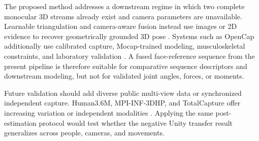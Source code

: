 The proposed method addresses a downstream regime in which two complete
monocular 3D streams already exist and camera parameters are unavailable.
Learnable triangulation and camera-aware fusion instead use images or 2D
evidence to recover geometrically grounded 3D pose
\citep{Iskakov2019Learnable,Qiu2019CrossView,Remelli2020Lightweight}. Systems
such as OpenCap additionally use calibrated capture, Mocap-trained modeling,
musculoskeletal constraints, and laboratory validation
\citep{Uhlrich2023OpenCap}. A fused face-reference sequence from the present
pipeline is therefore suitable for comparative sequence descriptors and
downstream modeling, but not for validated joint angles, forces, or moments.

Future validation should add diverse public multi-view data or synchronized
independent capture. Human3.6M, MPI-INF-3DHP, and TotalCapture offer increasing
variation or independent modalities
\citep{Ionescu2014Human36M,Mehta2017MPIINF3DHP,Trumble2017TotalCapture}.
Applying the same post-estimation protocol would test whether the negative
Unity transfer result generalizes across people, cameras, and movements.
